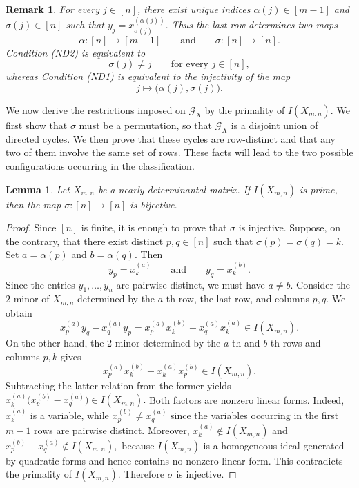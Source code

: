 \documentclass[12pt]{amsart}
\numberwithin{equation}{section}
\newtheorem{Lemma}[Theorem]{Lemma}
\newtheorem{Remark}[Theorem]{Remark}
\begin{document}
\begin{Remark}\label{rem:alpha-sigma}
{\em
For every $j\in[n]$, there exist unique indices $\alpha(j)\in[m-1]$ and $
\sigma(j)\in[n]$ such that $y_j=x_{\sigma(j)}^{(\alpha(j))}.$ Thus the last row determines two maps
\[
\alpha:[n]\longrightarrow[m-1]
\qquad\text{and}\qquad
\sigma:[n]\longrightarrow[n].
\]
Condition {\rm (ND2)} is equivalent to
\[
\sigma(j)\neq j
\qquad\text{for every }j\in[n],
\]
whereas Condition {\rm (ND1)} is equivalent to the injectivity of the map
\[
j\longmapsto\bigl(\alpha(j),\sigma(j)\bigr).
\]
}
\end{Remark}







We now derive the restrictions imposed on $\mathcal G_X$ by the
primality of $I(X_{m,n})$. We first show that $\sigma$ must be a permutation, so that $\mathcal G_X$ is a disjoint union of directed cycles. We then prove that these cycles are row-distinct and that any two of them involve the same set of rows. These facts will lead to the two possible configurations occurring in the classification.




\begin{Lemma}\label{lem:sigma-bijective}
Let $X_{m,n}$ be a nearly determinantal matrix. If $I(X_{m,n})$ is
prime, then the map $\sigma:[n]\longrightarrow[n]$ is bijective.
\end{Lemma}

\begin{proof}
Since $[n]$ is finite, it is enough to prove that $\sigma$ is
injective. Suppose, on the contrary, that there exist distinct
$p,q\in[n]$ such that $\sigma(p)=\sigma(q)=k.$ Set $a=\alpha(p)$ and $b=\alpha(q).$ Then
\[
y_p=x_k^{(a)}
\qquad\text{and}\qquad
y_q=x_k^{(b)}.
\]
Since the entries $y_1,\ldots,y_n$ are pairwise distinct, we must have
$a\neq b$. Consider the $2$-minor of $X_{m,n}$ determined by the $a$-th row, the
last row, and columns $p,q$. We obtain
\[
x_p^{(a)}y_q-x_q^{(a)}y_p
=
x_p^{(a)}x_k^{(b)}
-
x_q^{(a)}x_k^{(a)}
\in I(X_{m,n}).
\]
On the other hand, the $2$-minor determined by the $a$-th and $b$-th
rows and columns $p,k$ gives
\[
x_p^{(a)}x_k^{(b)}
-
x_k^{(a)}x_p^{(b)}
\in I(X_{m,n}).
\]
Subtracting the latter relation from the former yields $x_k^{(a)}
\bigl(x_p^{(b)}-x_q^{(a)}\bigr)
\in I(X_{m,n}).$ Both factors are nonzero linear forms. Indeed, $x_k^{(a)}$ is a
variable, while $x_p^{(b)}\neq x_q^{(a)}$ since the variables occurring in the first $m-1$ rows are pairwise
distinct. Moreover, $x_k^{(a)}\notin I(X_{m,n})$ and $x_p^{(b)}-x_q^{(a)}\notin I(X_{m,n}),$ because $I(X_{m,n})$ is a homogeneous ideal generated by quadratic
forms and hence contains no nonzero linear form. This contradicts the
primality of $I(X_{m,n})$. Therefore $\sigma$ is injective.
\end{proof}
\end{document}
